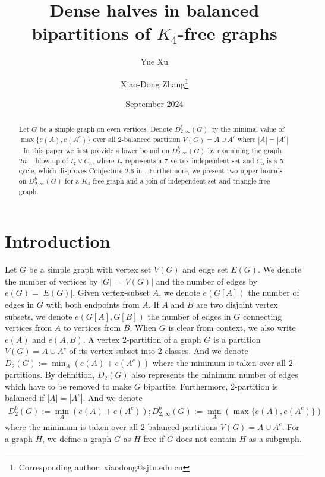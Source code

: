 \documentclass[11pt, oneside]{article}   	%
\title{Dense halves in balanced bipartitions of $K_4$-free graphs}
\author{Yue Xu}
\author{Xiao-Dong Zhang\thanks{Corresponding author: xiaodong@sjtu.edu.cn}}
\date{September 2024}
\affil{School of Mathematical Sciences, MOE-LSC, SHL-MAC, \\
Shanghai Jiao Tong University, 800 Dongchuan Road, Shanghai, 200240, P.R. China}
\begin{document}
\maketitle

\begin{abstract}
    Let $G$ be a simple graph on even vertices. Denote $D_{2,\infty}^b(G)$ by the minimal value of $\max\{e(A),e(A^c)\}$ over all 2-balanced partition $V(G)=A\cup A^c$ where $|A|=|A^c|$. In this paper we first provide a lower bound on $D_{2,\infty}^b(G)$ by examining the graph  $2n-$blow-up of $I_7\vee C_5$, where $I_7$ represents a 7-vertex independent set and $C_5$ is a 5-cycle, which disproves Conjecture 2.6 in \cite{balogh2023}. Furthermore, we present two upper bounds on $D_{2,\infty}^b(G)$ for a $K_4$-free graph and a join of independent set and triangle-free graph.
\end{abstract}

\newtheorem{Def}{Definition}[section]
\newtheorem{Th}[Def]{Theorem}
\newtheorem{Prop}[Def]{Proposition}
\newtheorem{Conj}[Def]{Conjecture}
\newtheorem{Fact}[Def]{Fact}
\newtheorem{lemma}[Def]{Lemma}
\newtheorem{remark}[Def]{Remark}
\newtheorem{Cor}[Def]{Corollary}

\section{Introduction}

Let $G$ be a simple graph with vertex set $V(G)$ and edge set $E(G)$. We denote the number of vertices by $|G| = |V(G)|$ and the number of edges by $e(G) = |E(G)|$. Given vertex-subset $A$, we denote $e(G[A])$ the number of edges in $G$ with both endpoints from $A$. If $A$ and $B$ are two disjoint vertex subsets, we denote $e(G[A],G[B])$ the number of edges in $G$ connecting vertices from $A$ to vertices from $B$. When $G$ is clear from context, we also write $e(A)$ and $e(A,B)$. A vertex 2-partition of a graph $G$ is a partition $V(G)=A\cup A^c$ of its vertex subset into 2 classes. And we denote $D_2(G):=\min_{A}(e(A)+e(A^c))$ where the minimum is taken over all $2$-partitions. By definition, $D_2(G)$ also represents the minimum number of edges which have to be removed to make $G$ bipartite. Furthermore, 2-partition is balanced if $|A|=|A^c|$. And we denote
$$
\begin{aligned}
    D_2^b(G):=\min\limits_{A}(e(A)+e(A^c)); D_{2,\infty}^b(G):=\min\limits_{A}\left(\max\{e(A),e(A^c)\}\right)
\end{aligned}
$$
where the minimum is taken over all $2$-balanced-partitions $V(G)=A\cup A^c$. For a graph $H$, we define a graph $G$ as $H$-free if $G$ does not contain $H$ as a subgraph.
\end{document}
